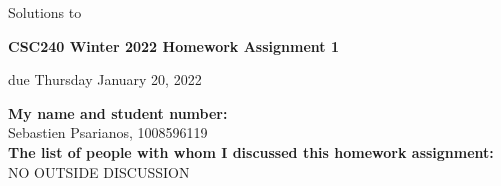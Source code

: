 \documentclass[11pt]{article}
\begin{document}
\begin{center}
\begin{solution}
Solutions to
\end{solution}
{\bf \Large \bf CSC240 Winter 2022 Homework Assignment 1}\\
\begin{question}
due Thursday January 20, 2022
\end{question}
\end{center}
\begin{solution}
\noindent
{\bf My name and student number: }\\
Sebastien Psarianos, 1008596119\\
\medskip
\noindent
{\bf The list of people with whom I discussed this homework assignment:} \\
NO OUTSIDE DISCUSSION\\
\end{solution}
\end{document}

